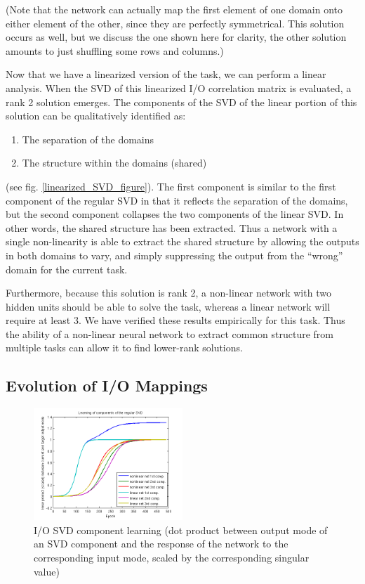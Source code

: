 \documentclass[10pt,letterpaper]{article}
\begin{document}
(Note that the network can actually map the first element of one domain onto either element of the other, since they are perfectly symmetrical. This solution occurs as well, but we discuss the one shown here for clarity, the other solution amounts to just shuffling some rows and columns.)\par
Now that we have a linearized version of the task, we can perform a linear analysis. When the SVD of this linearized I/O correlation matrix is evaluated, a rank 2 solution emerges. The components of the SVD of the linear portion of this solution can be qualitatively identified as: \begin{enumerate}
\item The separation of the domains
\item The structure within the domains (shared)
\end{enumerate}
(see fig. \ref{linearized_SVD_figure}). The first component is similar to the first component of the regular SVD in that it reflects the separation of the domains, but the second component collapses the two components of the linear SVD. In other words, the shared structure has been extracted. Thus a network with a single non-linearity is able to extract the shared structure by allowing the outputs in both domains to vary, and simply suppressing the output from the ``wrong'' domain for the current task.\par
Furthermore, because this solution is rank 2, a non-linear network with two hidden units should be able to solve the task, whereas a linear network will require at least 3. We have verified these results empirically for this task. Thus the ability of a non-linear neural network to extract common structure from multiple tasks can allow it to find lower-rank solutions.
 
 
\subsection{Evolution of I/O Mappings}
\begin{figure}
\centering
\includegraphics[width=0.5\textwidth]{figures/regular_SVD_component_learning.png}
\caption{I/O SVD component learning (dot product between output mode of an SVD component and the response of the network to the corresponding input mode, scaled by the corresponding singular value)}
\label{regular_SVD_component_learning}
\end{figure}
\end{document}
